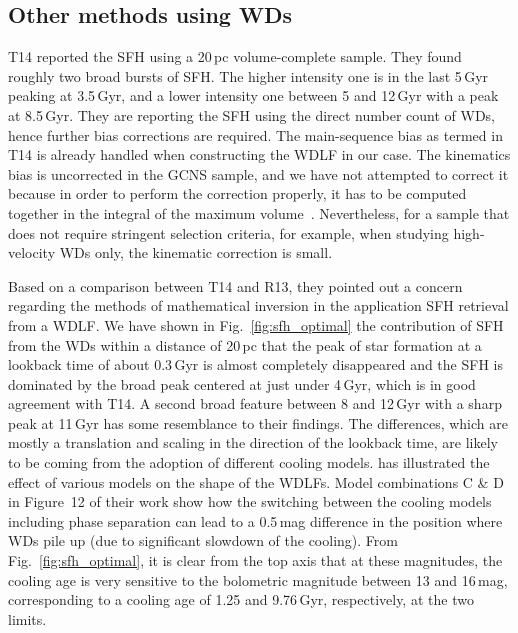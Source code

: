 \documentclass[fleqn,usenatbib]{mnras}
\begin{document}


\subsection{Other methods using WDs}
T14 reported the SFH using a 20\,pc volume-complete sample. They found roughly
two broad bursts of SFH. The higher intensity one is in the last 5\,Gyr peaking
at 3.5\,Gyr, and a lower intensity one between 5 and 12\,Gyr with a peak at
8.5\,Gyr. They are reporting the SFH using the direct number count of WDs,
hence further bias corrections are required. The main-sequence bias as termed in
T14 is already handled when constructing the WDLF in our case. The kinematics
bias is uncorrected in the GCNS sample, and we have not attempted to correct it
because in order to perform the correction properly, it has to be computed 
together in the integral of the maximum volume~\citep{2015MNRAS.450.4098L}.
Nevertheless, for a sample that does not require stringent selection
criteria, for example, when studying high-velocity WDs only, the
kinematic correction is small.

Based on a comparison between T14 and R13, they pointed out a concern regarding
the methods of mathematical inversion in the application SFH retrieval from a
WDLF. We have shown in Fig.~\ref{fig:sfh_optimal} the contribution of SFH
from the WDs within a distance of 20\,pc that the peak of star formation at a
lookback time of about 0.3\,Gyr is almost completely disappeared and the SFH is
dominated by the broad peak centered at just under 4\,Gyr, which is in good
agreement with T14. A second broad feature between 8 and 12\,Gyr with a sharp
peak at 11\,Gyr has some resemblance to their findings. The differences, which
are mostly a translation and scaling in the direction of the lookback time, are
likely to be coming from the adoption of different cooling models. 
\citet{2022RASTI...1...81L} has illustrated the effect of various models on 
the shape of the WDLFs. Model combinations C \& D in Figure~12 of their work show how the 
switching between the cooling models including phase separation can lead to
a 0.5\,mag difference in the position where WDs pile up (due to significant
slowdown of the cooling). From Fig.~\ref{fig:sfh_optimal}, it is clear from the
top axis that at these magnitudes, the cooling age is very sensitive to the
bolometric magnitude between 13 and 16\,mag, corresponding to a cooling age of
1.25 and 9.76\,Gyr, respectively, at the two limits.
\end{document}
